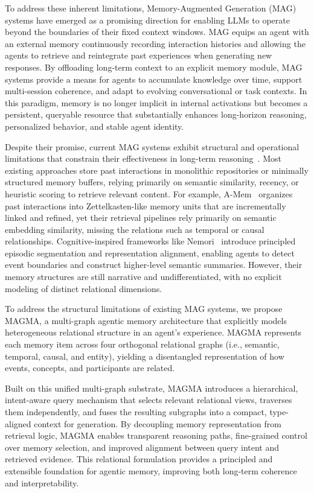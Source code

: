 \documentclass[11pt]{article}
\begin{document}
To address these inherent limitations, Memory-Augmented Generation (MAG) systems have emerged as a promising direction for enabling LLMs to operate beyond the boundaries of their fixed context windows. MAG equips an agent with an external memory continuously recording interaction histories and allowing the agents to retrieve and reintegrate past experiences when generating new responses. By offloading long-term context to an explicit memory module, MAG systems provide a means for agents to accumulate knowledge over time, support multi-session coherence, and adapt to evolving conversational or task contexts. In this paradigm, memory is no longer implicit in internal activations but becomes a persistent, queryable resource that substantially enhances long-horizon reasoning, personalized behavior, and stable agent identity.

Despite their promise, current MAG systems exhibit structural and operational limitations that constrain their effectiveness in long-term reasoning~\cite{li2025memos, chhikara2025mem0, xu2025mem, packer2023memgpt, rasmussen2025zep, wang2025mirix, Kang2025}. Most existing approaches store past interactions in monolithic repositories or minimally structured memory buffers, relying primarily on semantic similarity, recency, or heuristic scoring to retrieve relevant content. For example, A-Mem~\cite{xu2025mem} organizes past interactions into Zettelkasten-like memory units that are incrementally linked and refined, yet their retrieval pipelines rely primarily on semantic embedding similarity, missing the relations such as temporal or causal relationships. Cognitive-inspired frameworks like Nemori~\cite{nan2025nemori} introduce principled episodic segmentation and representation alignment, enabling agents to detect event boundaries and construct higher-level semantic summaries. However, their memory structures are still narrative and undifferentiated, with no explicit modeling of distinct relational dimensions.

To address the structural limitations of existing MAG systems, we propose MAGMA, a multi-graph agentic memory architecture that explicitly models heterogeneous relational structure in an agent’s experience. MAGMA represents each memory item across four orthogonal relational graphs (i.e., semantic, temporal, causal, and entity), yielding a disentangled representation of how events, concepts, and participants are related.

Built on this unified multi-graph substrate, MAGMA introduces a hierarchical, intent-aware query mechanism that selects relevant relational views, traverses them independently, and fuses the resulting subgraphs into a compact, type-aligned context for generation. By decoupling memory representation from retrieval logic, MAGMA enables transparent reasoning paths, fine-grained control over memory selection, and improved alignment between query intent and retrieved evidence. This relational formulation provides a principled and extensible foundation for agentic memory, improving both long-term coherence and interpretability. 
\end{document}
